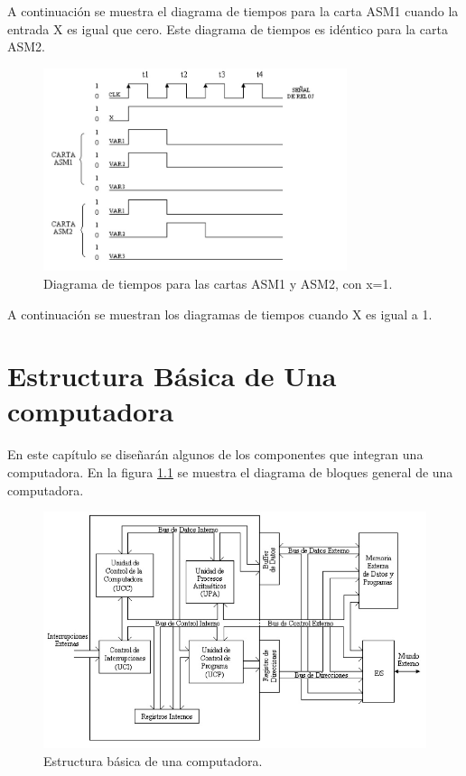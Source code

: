 \documentclass[12pt]{book}
\theoremstyle{definition}
\theoremstyle{remark}
\theoremstyle{plain}
\begin{document}
A continuación se muestra el diagrama de tiempos para la carta ASM1 cuando la entrada X es
igual que cero. Este diagrama de tiempos es idéntico para la carta ASM2.

\begin{figure}
\centering
\includegraphics[width=3.5in]{ASMtiempos2.jpg}
\caption{Diagrama de tiempos para las cartas ASM1 y ASM2, con x=1.}
\label{fig28}
\end{figure}

A continuación se muestran los diagramas de tiempos cuando X es igual a 1.



\chapter{Estructura Básica de Una computadora}

En este capítulo se diseñarán algunos de los componentes que integran una computadora. En la
figura \ref{fig29} se muestra el diagrama de bloques general de una computadora.

\begin{figure}
\centering
\includegraphics[width=5in]{computerbasica.jpg}
\caption{Estructura básica de una computadora.}
\label{fig29}
\end{figure}
\end{document}
